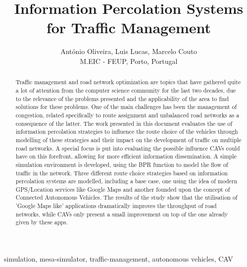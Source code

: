 \documentclass[lettersize,journal]{IEEEtran}
\begin{document}
\title{Information Percolation Systems for Traffic Management}
\author{António Oliveira, Luis Lucas, Marcelo Couto\\M.EIC - FEUP, Porto, Portugal}

%
{}

\maketitle

\begin{abstract}
    Traffic management and road network optimization are topics that have gathered quite a lot of attention from the computer science community for the last two decades, due to the relevance of the problems presented and the applicability of the area to find solutions for these problems. One of the main challenges has been the management of congestion, related specifically to route assignment and unbalanced road networks as a consequence of the latter. The work presented in this document evaluates the use of information percolation strategies to influence the route choice of the vehicles through modelling of these strategies and their impact on the development of traffic on multiple road networks. A special focus is put into evaluating the possible influence CAVs could have on this forefront, allowing for more efficient information dissemination. A simple simulation environment is developed, using the BPR function to model the flow of traffic in the network. Three different route choice strategies based on information percolation systems are modelled, including a base case, one using the idea of modern GPS/Location services like Google Maps and another founded upon the concept of Connected Autonomous Vehicles. The results of the study show that the utilisation of 'Google Maps like' applications dramatically improves the throughput of road networks, while CAVs only present a small improvement on top of the one already given by these apps.   
\end{abstract}

\begin{IEEEkeywords}
simulation, mesa-simulator, traffic-management, autonomous vehicles, CAV
\end{IEEEkeywords}











\newpage
\end{document}
